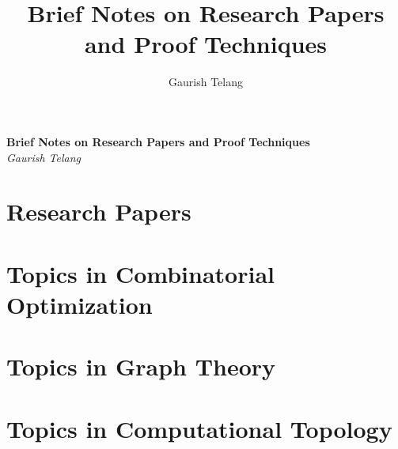 
\usepackage{mdframed}
\usepackage{xcolor}
\usepackage{soul}
\newcommand{\red}[1]{{\color{red} #1}}
\newcommand{\blue}[1]{{\color{blue} #1}}
\newcommand{\green}[1]{{\color{OliveGreen} #1}}
\usepackage[backend=bibtex, style=numeric, sorting=none]{biblatex} 
\setlength\bibitemsep{\baselineskip}

\title{Brief Notes on Research Papers and Proof Techniques}
\author{Gaurish Telang}
\date{}

\setcounter{tocdepth}{0}

\begin{titlepage}
   \begin{center}
     \textbf{ {\Huge Brief Notes on Research Papers and Proof Techniques} }\\
     \vspace{5mm}
      \large\textsl{Gaurish Telang}
   \end{center}
\end{titlepage}

\tableofcontents
\part{Research Papers}
\part{Topics in Combinatorial Optimization}
\part{Topics in Graph Theory}

\part{Topics in Computational Topology}
\newpage
